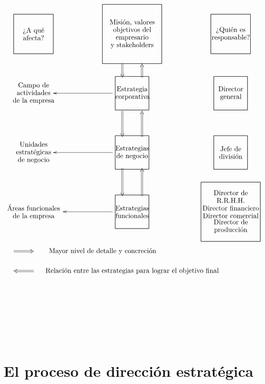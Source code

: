 \documentclass[10pt,a4paper,spanish]{report}
\begin{document}
                  \[\begin{xy}
                        ,(-50,0)*+=[F]=<2cm>[F]\txt<2cm>{¿A qué afecta?}
                        ,(-50,-30)*+=[]=<3cm>[]\txt<3cm>{Campo de actividades\\de la empresa}
                        ,(-50,-60)*+=[]=<3cm>[]\txt<3cm>{Unidades estratégicas\\de negocio}
                        ,(-50,-90)*+=[]=<3cm>[]\txt<3cm>{Áreas funcionales\\de la empresa}
                        ,(0,0)*+=[F]=<3cm>[F]\txt<3cm>{Misión, valores\\objetivos del empresario\\y stakeholders}
                        ,(0,-30)*+=[F]=<1.7cm>[F]\txt<1.7cm>{Estrategia\\corporativa}
                        ,(0,-60)*+=[F]=<1.7cm>[F]\txt<1.7cm>{Estrategias\\de negocio}
                        ,(0,-90)*+=[F]=<1.7cm>[F]\txt<1.7cm>{Estrategias\\funcionales}
                        ,(50,0)*+=[F]=<2cm>[F]\txt<2cm>{¿Quién es\\responsable?}
                        ,(50,-30)*+=[F]=<1.7cm>[F]\txt<1.7cm>{Director general}
                        ,(50,-60)*+=[F]=<1.7cm>[F]\txt<1.7cm>{Jefe de división}
                        ,(50,-90)*+=[F]=<3cm>[F]\txt<3cm>{Director de R.R.H.H.\\Director financiero\\Director comercial\\Director de producción}
                        ,(-15,-110)*+=[]=<7cm>[]\txt{Mayor nivel de detalle y concreción}
                        ,(0,-120)*+=[]=<7cm>[]\txt{Relación entre las estrategias para lograr el objetivo final}
                        \ar@{->} (-10,-30);(-40,-30)
                        \ar@{->} (-10,-60);(-40,-60)
                        \ar@{->} (-10,-90);(-35,-90)
                        \ar@{=>} (-5,-15);(-5,-22)
                        \ar@{<=} (5,-15);(5,-22)
                        \ar@{=>} (-5,-39);(-5,-52)
                        \ar@{<=} (5,-39);(5,-52)
                        \ar@{=>} (-5,-68);(-5,-82)
                        \ar@{<=} (5,-68);(5,-82)
                        \ar@{<=} (-50,-110);(-60,-110)
                        \ar@{=>} (-50,-120);(-60,-120)
                  \end{xy}\]

      \section{\textcolor[rgb]{0.4,0.9,0.6}El proceso de dirección estratégica}
\end{document}
